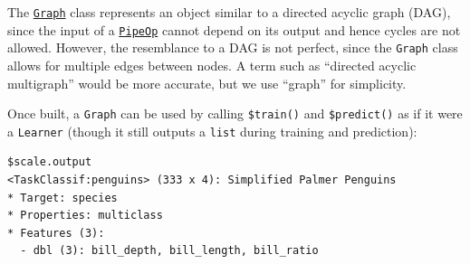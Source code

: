 \begin{tcolorbox}[enhanced jigsaw, opacitybacktitle=0.6, rightrule=.15mm, opacityback=0, arc=.35mm, breakable, titlerule=0mm, colframe=quarto-callout-tip-color-frame, coltitle=black, bottomrule=.15mm, toprule=.15mm, colback=white, colbacktitle=quarto-callout-tip-color!10!white, bottomtitle=1mm, toptitle=1mm, title=\textcolor{quarto-callout-tip-color}{\faLightbulb}\hspace{0.5em}{Graphs and DAGs}, leftrule=.75mm, left=2mm]

The
\href{https://mlr3pipelines.mlr-org.com/reference/Graph.html}{\texttt{Graph}}
class represents an object similar to a directed acyclic
graph
(DAG), since the input of a
\href{https://mlr3pipelines.mlr-org.com/reference/PipeOp.html}{\texttt{PipeOp}}
cannot depend on its output and hence cycles are not allowed. However,
the resemblance to a DAG is not perfect, since the \texttt{Graph} class
allows for multiple edges between nodes. A term such as ``directed
acyclic multigraph'' would be more accurate, but we use ``graph'' for
simplicity.

\end{tcolorbox}

Once built, a \texttt{Graph} can be used by calling \texttt{\$train()}
and \texttt{\$predict()} as if it were a \texttt{Learner} (though it
still outputs a \texttt{list} during training and prediction):

\begin{Shaded}
\begin{Highlighting}[]
\OtherTok{=}\SpecialCharTok{$}
\end{Highlighting}
\end{Shaded}

\begin{verbatim}
$scale.output
<TaskClassif:penguins> (333 x 4): Simplified Palmer Penguins
* Target: species
* Properties: multiclass
* Features (3):
  - dbl (3): bill_depth, bill_length, bill_ratio
\end{verbatim}

\begin{Shaded}
\begin{Highlighting}[]
\NormalTok{result[[}\NormalTok{]]}\SpecialCharTok{$}\NormalTok{()[}\SpecialCharTok{:}\NormalTok{]}
\end{Highlighting}
\end{Shaded}


